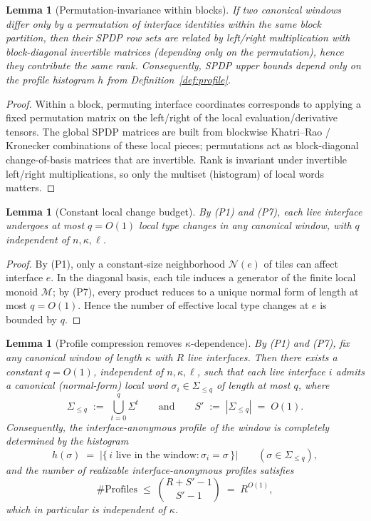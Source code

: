 \documentclass[12pt]{article}
\newtheorem{lemma}[theorem]{Lemma}
\theoremstyle{definition}
\theoremstyle{definition}
\theoremstyle{remark}
\theoremstyle{remark}
\begin{document}
\begin{lemma}[Permutation-invariance within blocks]
\label{lem:perm-invariance}
If two canonical windows differ only by a permutation of interface identities within the same block
partition, then their SPDP row sets are related by left/right multiplication with block-diagonal invertible
matrices (depending only on the permutation), hence they contribute the same rank. Consequently, SPDP
upper bounds depend only on the profile histogram $h$ from Definition~\ref{def:profile}.
\end{lemma}

\begin{proof}
Within a block, permuting interface coordinates corresponds to applying a fixed permutation matrix on the
left/right of the local evaluation/derivative tensors. The global SPDP matrices are built from blockwise
Khatri--Rao / Kronecker combinations of these local pieces; permutations act as block-diagonal change-of-basis
matrices that are invertible. Rank is invariant under invertible left/right multiplications, so only the
multiset (histogram) of local words matters.
\end{proof}

\begin{lemma}[Constant local change budget]
\label{lem:budget}
By (P1) and (P7), each live interface undergoes at most $q=O(1)$ local type changes in any canonical
window, with $q$ independent of $n,\kappa,\ell$.
\end{lemma}

\begin{proof}
By (P1), only a constant-size neighborhood $\mathcal{N}(e)$ of tiles can affect interface $e$.
In the diagonal basis, each tile induces a generator of the finite local monoid $\mathcal{M}$; by (P7),
every product reduces to a unique normal form of length at most $q=O(1)$. Hence the number of effective local
type changes at $e$ is bounded by $q$.
\end{proof}

\begin{lemma}[Profile compression removes $\kappa$-dependence]
\label{lem:profile-compression-removes-k}
By (P1) and (P7), fix any canonical window of length $\kappa$ with $R$ live
interfaces. Then there exists a constant $q=O(1)$, independent of $n,\kappa,\ell$,
such that each live interface $i$ admits a canonical (normal-form) local word
$\sigma_i \in \Sigma_{\le q}$ of length at most $q$, where
\[
\Sigma_{\le q} \;:=\; \bigcup_{t=0}^{q} \Sigma^{t}
\qquad\text{and}\qquad
S' \;:=\; |\Sigma_{\le q}| \;=\; O(1).
\]
Consequently, the interface-anonymous profile of the window is completely
determined by the histogram
\[
h(\sigma) \;=\; \bigl|\{\, i \text{ live in the window} : \sigma_i=\sigma \,\}\bigr|
\qquad (\sigma\in\Sigma_{\le q}),
\]
and the number of realizable interface-anonymous profiles satisfies
\[
\#\mathrm{Profiles}
\;\le\;
\binom{R+S'-1}{S'-1}
\;=\;
R^{O(1)},
\]
which in particular is independent of $\kappa$.
\end{lemma}
\end{document}
